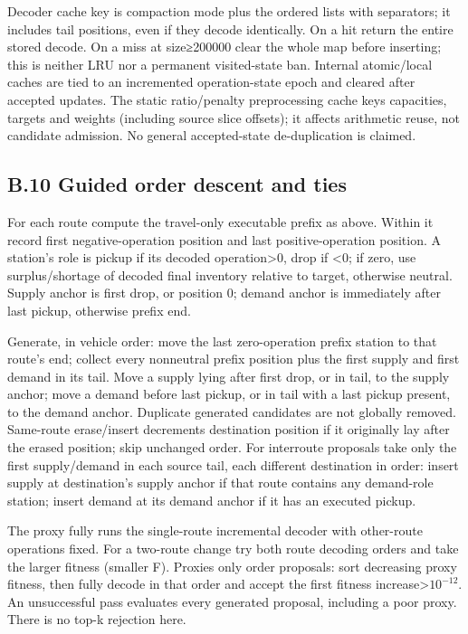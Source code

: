 \documentclass[
  american,
  11pt,
]{article}
\begin{document}
Decoder cache key is compaction mode plus the ordered lists with
separators; it includes tail positions, even if they decode identically.
On a hit return the entire stored decode. On a miss at size≥200000 clear
the whole map before inserting; this is neither LRU nor a permanent
visited-state ban. Internal atomic/local caches are tied to an
incremented operation-state epoch and cleared after accepted updates.
The static ratio/penalty preprocessing cache keys capacities, targets
and weights (including source slice offsets); it affects arithmetic
reuse, not candidate admission. No general accepted-state de-duplication
is claimed.

\subsection{B.10 Guided order descent and
ties}\label{b.10-guided-order-descent-and-ties}

For each route compute the travel-only executable prefix as above.
Within it record first negative-operation position and last
positive-operation position. A station's role is pickup if its decoded
operation\textgreater0, drop if \textless0; if zero, use
surplus/shortage of decoded final inventory relative to target,
otherwise neutral. Supply anchor is first drop, or position 0; demand
anchor is immediately after last pickup, otherwise prefix end.

Generate, in vehicle order: move the last zero-operation prefix station
to that route's end; collect every nonneutral prefix position plus the
first supply and first demand in its tail. Move a supply lying after
first drop, or in tail, to the supply anchor; move a demand before last
pickup, or in tail with a last pickup present, to the demand anchor.
Duplicate generated candidates are not globally removed. Same-route
erase/insert decrements destination position if it originally lay after
the erased position; skip unchanged order. For interroute proposals take
only the first supply/demand in each source tail, each different
destination in order: insert supply at destination's supply anchor if
that route contains any demand-role station; insert demand at its demand
anchor if it has an executed pickup.

The proxy fully runs the single-route incremental decoder with
other-route operations fixed. For a two-route change try both route
decoding orders and take the larger fitness (smaller F). Proxies only
order proposals: sort decreasing proxy fitness, then fully decode in
that order and accept the first fitness
increase\textgreater{}\(10^{-12}\). An unsuccessful pass evaluates every
generated proposal, including a poor proxy. There is no top-k rejection
here.
\end{document}
